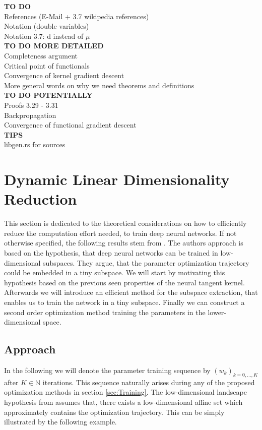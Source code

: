 \documentclass[11pt, a4paper]{article}
\newcommand{\N}{\mathds{N}}
\begin{document}
\textbf{TO DO} \\
References (E-Mail + 3.7 wikipedia references) \\
Notation (double variables) \\
Notation 3.7: d instead of $\mu$ \\

\textbf{TO DO MORE DETAILED} \\
Completeness argument \\
Critical point of functionals \\
Convergence of kernel gradient descent \\
More general words on why we need theorems and definitions \\

\textbf{TO DO POTENTIALLY} \\
Proofs 3.29 - 3.31 \\
Backpropagation \\
Convergence of functional gradient descent \\

\textbf{TIPS} \\
libgen.rs for sources \\

\pagebreak
\section{Dynamic Linear Dimensionality Reduction}

This section is dedicated to the theoretical considerations on how to efficiently reduce the computation effort needed, to train deep neural networks. If not otherwise specified, the following results stem from \cite{Paper}. The authors approach is based on the hypothesis, that deep neural networks can be trained in low-dimensional subspaces. They argue, that the parameter optimization trajectory could be embedded in a tiny subspace. We will start by motivating this hypothesis based on the previous seen properties of the neural tangent kernel. Afterwards we will introduce an efficient method for the subspace extraction, that enables us to train the network in a tiny subspace. Finally we can construct a second order optimization method training the parameters in the lower-dimensional space.

\subsection{Approach}

In the following we will denote the parameter training sequence by $(w_k)_{k=0, \dots, K}$ after $K \in \N$ iterations. This sequence naturally arises during any of the proposed optimization methods in section \ref{sec:Training}. The low-dimensional landscape hypothesis from \cite{Paper} assumes that, there exists a low-dimensional affine set which approximately contains the optimization trajectory. This can be simply illustrated by the following example.
\end{document}
